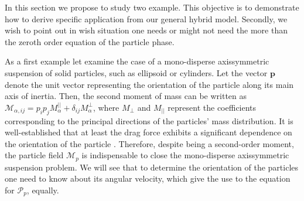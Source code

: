 In this section we propose to study two example. 
This objective is to demonstrate how to derive specific application from our general hybrid model. 
Secondly, we wish to point out in wish situation one needs or might not need the more than the zeroth order equation of the particle phase.


As a first example let examine the case of a mono-disperse axissymmetric suspension of solid particles, such as ellipsoid or cylinders.
Let the vector $\textbf{p}$ denote the unit vector representing the orientation of the particle along its main axis of inertia. 
Then, the second moment of mass can be written as $\mathcal{M}_{\alpha,ij} =  p_ip_j M_\alpha^{||} +  \delta_{ij} M_\alpha^\bot$, where $M_{\bot}$ and $M_{||}$ represent the coefficients corresponding to the principal directions of the particles' mass distribution.
It is well-established that at least the drag force exhibits a significant dependence on the orientation of the particle \citep{kim2013microhydrodynamics}.
Therefore, despite being a second-order moment, the particle field $\mathcal{M}_p$ is indispensable to close the mono-disperse axissymmetric suspension problem.
We will see that to determine the orientation of the particles one need to know about its angular velocity, which give the use to the equation for $\mathcal{P}_p$, equally.  



